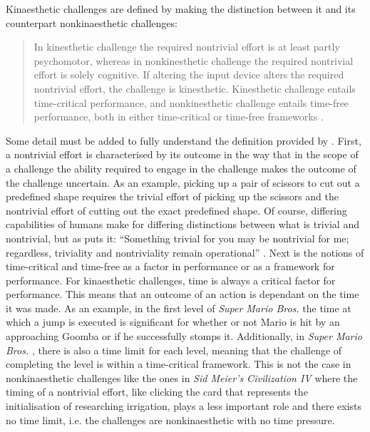 Kinaesthetic challenges are defined by making the distinction between it and its counterpart nonkinaesthetic challenges:
\begin{quote}
  In kinesthetic challenge the required nontrivial effort is at least partly psychomotor, whereas in nonkinesthetic challenge the required nontrivial effort is solely cognitive. If altering the input device alters the required nontrivial effort, the challenge is kinesthetic. Kinesthetic challenge entails time-critical performance, and nonkinesthetic challenge entails time-free performance, both in either time-critical or time-free frameworks \cite{karhulahti}.
\end{quote}
Some detail must be added to fully understand the definition provided by . First, a nontrivial effort is characterised by its outcome in the way that in the scope of a challenge the ability required to engage in the challenge makes the outcome of the challenge uncertain. As an example, picking up a pair of scissors to cut out a predefined shape requires the trivial effort of picking up the scissors and the nontrivial effort of cutting out the exact predefined shape. Of course, differing capabilities of humans make for differing distinctions between what is trivial and nontrivial, but as  puts it: ``Something trivial for you may be nontrivial for me; regardless, triviality and nontriviality remain operational'' \cite{karhulahti}. Next is the notions of time-critical and time-free as a factor in performance or as a framework for performance. For kinaesthetic challenges, time is always a critical factor for performance. This means that an outcome of an action is dependant on the time it was made. As an example, in the first level of \textit{Super Mario Bros.} \cite{mario} the time at which a jump is executed is significant for whether or not Mario is hit by an approaching Goomba or if he successfully stomps it. Additionally, in \textit{Super Mario Bros.} \cite{mario}, there is also a time limit for each level, meaning that the challenge of completing the level is within a time-critical framework. This is not the case in nonkinaesthetic challenges like the ones in \textit{Sid Meier's Civilization IV} where the timing of a nontrivial effort, like clicking the card that represents the initialisation of researching irrigation, plays a less important role and there exists no time limit, i.e. the challenges are nonkinaesthetic with no time pressure.

